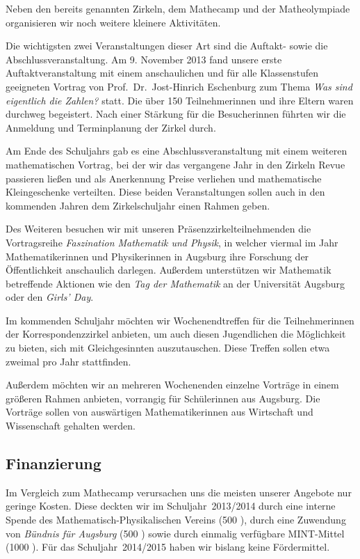 \documentclass[12pt]{zettel}
\begin{document}
Neben den bereits genannten Zirkeln, dem Mathecamp und der
Matheolympiade organisieren wir noch weitere kleinere
Aktivitäten.

Die wichtigsten zwei Veranstaltungen dieser Art sind die Auftakt- sowie die
Abschlussveranstaltung. Am 9. November 2013 fand unsere erste
Auftaktveranstaltung mit einem anschaulichen und für alle Klassenstufen
geeigneten Vortrag von
Prof.~Dr.~Jost-Hinrich Eschenburg zum Thema \emph{Was sind eigentlich die
Zahlen?} statt.
Die über 150 Teilnehmerinnen und ihre Eltern waren durchweg
begeistert. Nach einer Stärkung für die Besucherinnen führten wir
die Anmeldung und Terminplanung der Zirkel durch.

Am Ende des Schuljahrs gab es eine Abschlussveranstaltung mit einem
weiteren mathematischen Vortrag, bei der wir
das vergangene Jahr in den Zirkeln Revue passieren ließen und als Anerkennung
Preise verliehen und mathematische Kleingeschenke verteilten. Diese beiden Veranstaltungen sollen
auch in den kommenden Jahren dem Zirkelschuljahr einen Rahmen geben.

Des Weiteren besuchen wir mit unseren Präsenzzirkelteilnehmenden die
Vortragsreihe \emph{Faszination Mathematik und Physik}, in welcher viermal im
Jahr Mathematikerinnen und Physikerinnen in Augsburg ihre Forschung der
Öffent\-lich\-keit anschaulich darlegen. Außerdem unterstützen wir
Mathematik betreffende Aktionen wie den \emph{Tag der Mathematik} an
der Universität Augsburg oder den \emph{Girls' Day}.

Im kommenden Schuljahr möchten wir Wochenendtreffen für die Teil\-neh\-mer\-in\-nen der Korrespondenzzirkel anbieten, um auch diesen Jugendlichen die
Möglichkeit zu bieten, sich mit Gleichgesinnten auszutauschen. Diese Treffen
sollen etwa zweimal pro Jahr stattfinden.

Außerdem möchten wir an mehreren Wochenenden einzelne Vorträge in einem
größeren Rahmen anbieten, vorrangig für Schülerinnen aus Augsburg.
Die Vorträge sollen von auswärtigen Mathematikerinnen aus Wirtschaft und Wissenschaft gehalten werden.


\subsection{Finanzierung}

Im Vergleich zum Mathecamp verursachen uns die meisten unserer Angebote nur
geringe Kosten. Diese deckten wir im Schuljahr~2013/2014 durch eine interne
Spende des Mathematisch-Physikalischen Vereins (500 \texteuro), durch eine
Zuwendung von \emph{Bündnis für Augsburg} (500 \texteuro) sowie durch einmalig
verfügbare MINT-Mittel (1000 \texteuro). Für das Schuljahr~2014/2015 haben wir
bislang keine Fördermittel.
\end{document}
